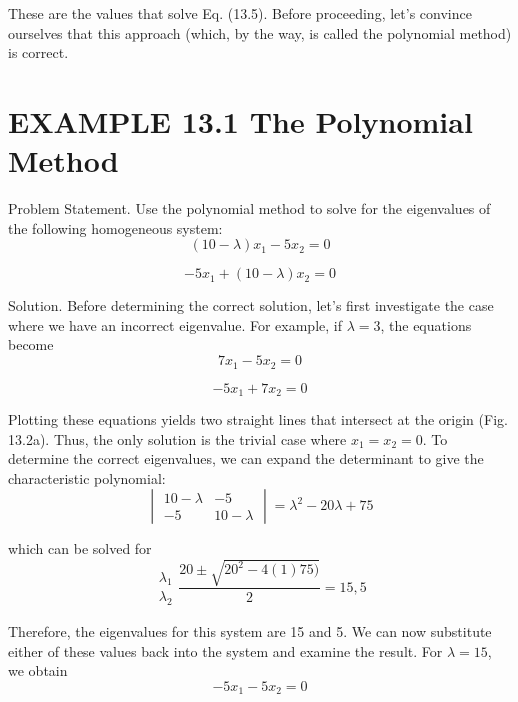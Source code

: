 \documentclass[../main.tex]{subfiles}
\begin{document}
These are the values that solve Eq. (13.5). Before proceeding, let's convince ourselves that
this approach (which, by the way, is called the polynomial method) is correct.


\section*{EXAMPLE 13.1 The Polynomial Method}

Problem Statement. Use the polynomial method to solve for the eigenvalues of the following homogeneous system:
\begin{equation}
(10-\lambda )x_{1}-5x_{2}=0
\end{equation}

\begin{equation}
-5x_{1}+(10-\lambda )x_{2}=0
\end{equation}

Solution. Before determining the correct solution, let's first investigate the case where
we have an incorrect eigenvalue. For example, if $\lambda = 3$, the equations become
\begin{equation}
7x_{1}-5x_{2}=0
\end{equation}

\begin{equation}
-5x_{1}+7x_{2}=0
\end{equation}

Plotting these equations yields two straight lines that intersect at the origin (Fig. 13.2a).
Thus, the only solution is the trivial case where $x_{1} = x_{2} = 0$.
To determine the correct eigenvalues, we can expand the determinant to give the characteristic polynomial:
\begin{equation}
\begin{vmatrix}
10-\lambda  &-5 \\
-5 & 10-\lambda
\end{vmatrix}
=\lambda ^{2}-20\lambda +75
\end{equation}

which can be solved for
\begin{equation}
\begin{matrix}
\lambda _{1}\\
\lambda _{2}
\end{matrix}
\frac{20\pm \sqrt{20^{2}-4(1)75)}}{2}=15,5
\end{equation}

Therefore, the eigenvalues for this system are 15 and 5.
We can now substitute either of these values back into the system and examine the result. For $\lambda = 15$, we obtain
\begin{equation}
-5x_{1}-5x_{2}=0
\end{equation}
\end{document}

